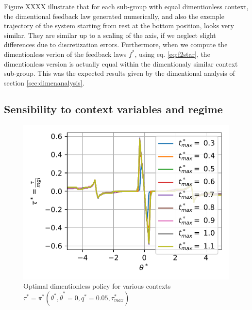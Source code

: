 Figure XXXX illustrate that for each sub-group with equal dimentionless context, the dimentional feedback law generated numerically, and also the exemple trajectory of the system starting from rest at the bottom position, looks very similar. They are similar up to a scaling of the axis, if we neglect slight differences due to discretization errors. Furthermore, when we compute the dimentionless verion of the feedback laws $f^*$, using eq. \eqref{eq:f2star}, the dimentionless version is actually equal within the dimentionaly similar context sub-group. This was the expected results given by the dimentional analysis of section \ref{sec:dimenanalysis}.



\subsection{Sensibility to context variables and regime}

\begin{figure}[ht]
\begin{center}
\includegraphics[width=0.99\linewidth]{fig/regime.pdf}
\caption{Optimal dimentionless policy for various contexts $\tau^* = \pi^*( \theta^* , \dot{\theta}^* = 0 , q^* = 0.05 , \tau^*_{max} )$}\label{fig:regime}
\end{center}
\end{figure}

